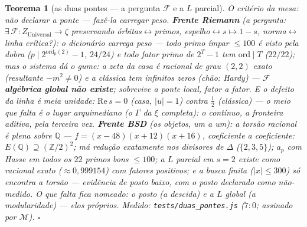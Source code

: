 \documentclass[11pt,a4paper]{article}
\newtheorem{teorema}{Teorema}
\newcommand{\code}[1]{\texttt{\small #1}}
\begin{document}
\begin{teorema}[as duas pontes --- a pergunta $\mathcal{F}$ e a $L$
parcial]\label{thm:duas-pontes}
O critério da mesa: não declarar a ponte --- fazê-la carregar peso.
\textbf{Frente Riemann} (a pergunta:
$\exists\,\mathcal{F}:Z_{\mathrm{Universal}}\to\zeta$ preservando
órbitas$\leftrightarrow$primos, espelho$\leftrightarrow s\mapsto1-s$,
norma$\leftrightarrow$linha crítica?):
o \emph{dicionário carrega peso} --- todo primo ímpar $\le100$ é
visto pela dobra ($p\mid2^{\mathrm{ord}_{p}(2)}-1$, $24/24$) e todo
fator primo de $2^{T}-1$ tem $\mathrm{ord}\mid T$ ($22/22$); mas
\emph{o sistema dá o gume}: a zeta da casa é racional de grau $(2,2)$
exato (resultante $-m^{2}\ne0$) e a clássica tem infinitos zeros
(chão: Hardy) --- \textbf{$\mathcal{F}$ algébrica global não existe};
sobrevive a ponte \emph{local}, fator a fator. E o defeito da linha é
\emph{meia unidade}: $\mathrm{Re}\,s=0$ (casa, $|u|=1$) contra
$\tfrac12$ (clássica) --- o meio que falta é o lugar arquimediano (o
$\Gamma$ da $\xi$ completa): \emph{o contínuo, a fronteira aditiva,
pela terceira vez}.
\textbf{Frente BSD} (os objetos, um a um): a torsão racional é
\emph{plena} sobre $\mathbb{Q}$ ---
$f=(x-48)(x+12)(x+16)$, coeficiente a coeficiente:
$E(\mathbb{Q})\supseteq(\mathbb{Z}/2)^{2}$; má redução exatamente nos
divisores de $\Delta$ ($\{2,3,5\}$); $a_{p}$ com Hasse em todos os
$22$ primos bons $\le100$; a $L$ parcial em $s=2$ existe como racional
exato ($\approx0{,}999154$) com fatores positivos; e a busca finita
($|x|\le300$) só encontra a torsão --- evidência de posto baixo,
\emph{com o posto declarado como não-medido}. O que falta fica
nomeado: o posto (a descida) e a $L$ global (a modularidade) --- elos
próprios.
\emph{Medido:} \code{tests/duas\_pontes.js} ($7{:}0$; assinado por
$\mathcal{M}$).
$\square$
\end{teorema}
\end{document}
